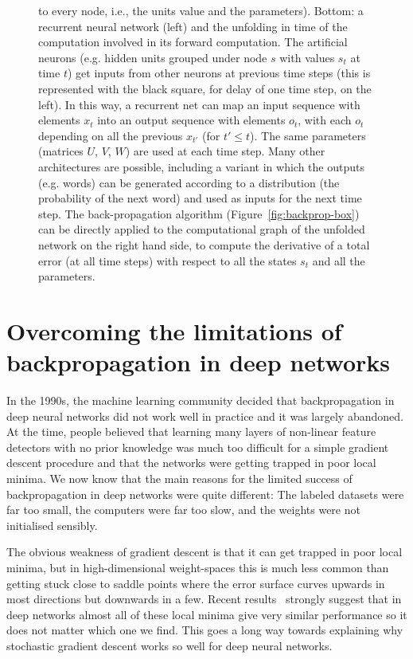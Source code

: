 \documentclass[]{article}
\begin{document}
\begin{figure}[H]
{to every node, i.e., the units value and the parameters).\newline
Bottom: a recurrent neural network (left) and the unfolding in time of the
computation involved in its forward computation. The artificial neurons
(e.g. hidden units grouped under node $s$ with values $s_t$ at time $t$) 
get inputs from other neurons at previous time steps
(this is represented with the black square, for delay of
one time step, on the left). In this way, a recurrent net can map an input sequence
with elements $x_t$ into an output sequence with elements $o_t$, with
each $o_t$ depending on all the previous $x_{t'}$ (for $t'\leq t$). The
same parameters (matrices $U$, $V$, $W$) are used at each time step.
Many other architectures are possible, including a variant in which
the outputs (e.g. words) can be generated according to a distribution 
(the probability of the next word) and used as inputs for the next time step.
The back-propagation algorithm (Figure~\ref{fig:backprop-box})
can be directly applied to the computational graph of the unfolded network
on the right hand side, to compute the derivative of a total error
(at all time steps) with respect to all the states $s_t$ and all the parameters.
}
\label{fig:mlp}
\end{figure}

\section{Overcoming the limitations of backpropagation in deep networks}

In the 1990s, the machine learning community decided that backpropagation
in deep neural networks did not work well in practice and it was largely
abandoned.  At the time, people believed that learning many layers of
non-linear feature detectors with no prior knowledge was much too difficult
for a simple gradient descent procedure and that the networks were getting
trapped in poor local minima. We now know that the main reasons for the
limited success of backpropagation in deep networks were quite different:
The labeled datasets were far too small, the computers were far too slow,
and the weights were not initialised sensibly.

The obvious weakness of gradient descent is that it can get trapped in poor
local minima, but in high-dimensional weight-spaces this is much less
common than getting stuck close to saddle points where the error surface
curves upwards in most directions but downwards in a few. Recent
results~\citep{Dauphin-et-al-NIPS2014-small,Choromanska-et-al-arxiv2014} strongly suggest
that in deep networks almost all of these local minima give very similar
performance so it does not matter which one we find.  This goes a long way
towards explaining why stochastic gradient descent works so well for deep
neural networks.
\end{document}
